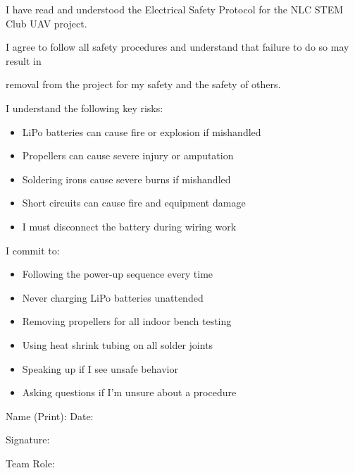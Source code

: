 \documentclass[11pt,letterpaper]{article}
\begin{document}
{{I have read and understood the Electrical Safety Protocol for the NLC STEM Club UAV project.\par

I agree to follow all safety procedures and understand that failure to do so may result in\par

removal from the project for my safety and the safety of others.\par

I understand the following key risks:\par

\begin{itemize}
  \item LiPo batteries can cause fire or explosion if mishandled
  \item Propellers can cause severe injury or amputation
  \item Soldering irons cause severe burns if mishandled
  \item Short circuits can cause fire and equipment damage
  \item I must disconnect the battery during wiring work
\end{itemize}

I commit to:\par

\begin{itemize}
  \item Following the power-up sequence every time
  \item Never charging LiPo batteries unattended
  \item Removing propellers for all indoor bench testing
  \item Using heat shrink tubing on all solder joints
  \item Speaking up if I see unsafe behavior
  \item Asking questions if I'm unsure about a procedure
\end{itemize}

Name (Print): \underline{\hspace{4.95cm}}     Date: \underline{\hspace{2.4cm}}\par

Signature:    \underline{\hspace{4.95cm}}\par

Team Role:    \underline{\hspace{4.95cm}}\par

}}
\end{document}
